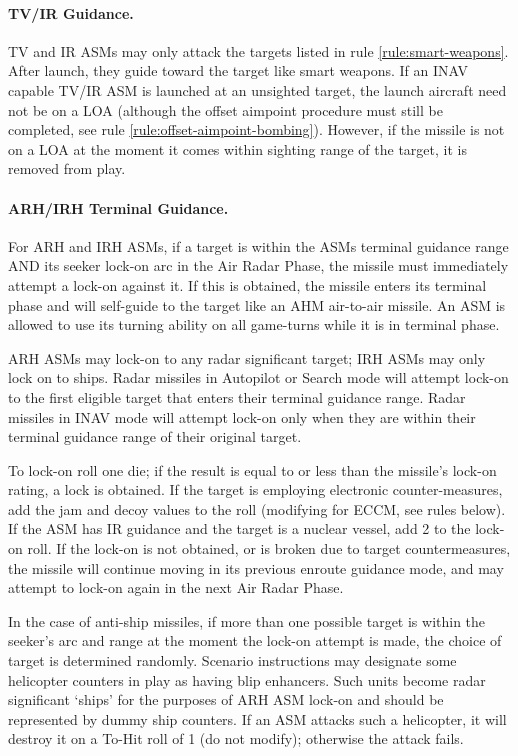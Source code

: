 \begin{advancedrules}
\begin{itemize}
\end{itemize}

\paragraph{TV/IR Guidance.} TV and IR ASMs may only attack the targets listed in rule \ref{rule:smart-weapons}.  After launch, they guide toward the target like smart weapons. If an INAV capable TV/IR ASM is launched at an unsighted target, the launch aircraft need not be on a LOA (although the offset aimpoint procedure must still be completed, see rule \ref{rule:offset-aimpoint-bombing}).  However, if the missile is not on a LOA at the moment it comes within sighting range of the target, it is removed from play.

\paragraph{ARH/IRH Terminal Guidance.} For ARH and IRH ASMs, if a target is within the ASMs terminal guidance range AND its seeker lock-on arc in the Air Radar Phase, the missile must immediately attempt a lock-on against it.  If this is obtained, the missile enters its terminal phase and will self-guide to the target like an AHM air-to-air missile.  An ASM is allowed to use its turning ability on all game-turns while it is in terminal phase.

ARH ASMs may lock-on to any radar significant target; IRH ASMs may only lock on to ships.  Radar missiles in Autopilot or Search mode will attempt lock-on to the first eligible target that enters their terminal guidance range.  Radar missiles in INAV mode will attempt lock-on only when they are within their terminal guidance range of their original target.

To lock-on roll one die; if the result is equal to or less than the missile's lock-on rating, a lock is obtained. If the target is employing electronic counter-measures, add the jam and decoy values to the roll (modifying for ECCM, see rules below).  If the ASM has IR guidance and the target is a nuclear vessel, add 2 to the lock-on roll.  If the lock-on is not obtained, or is broken due to target countermeasures, the missile will continue moving in its previous enroute guidance mode, and may attempt to lock-on again in the next Air Radar Phase.

In the case of anti-ship missiles, if more than one possible target is within the seeker's arc and range at the moment the lock-on attempt is made, the choice of target is determined randomly. Scenario instructions may designate some helicopter counters in play as having blip enhancers. Such units become radar significant ‘ships' for the purposes of ARH ASM lock-on and should be represented by dummy ship counters.  If an ASM attacks such a helicopter, it will destroy it on a To-Hit roll of 1 (do not modify); otherwise the attack fails.


\end{advancedrules}
